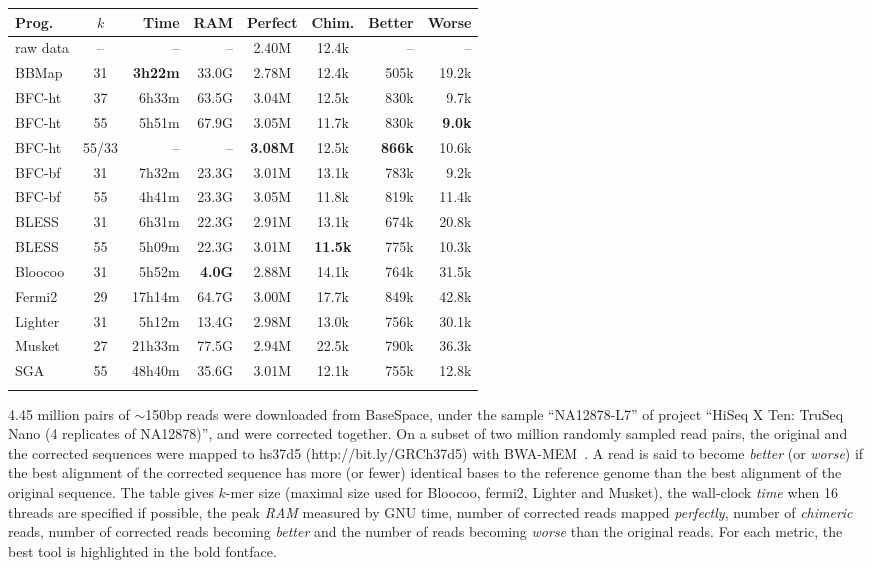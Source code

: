 \documentclass{bioinfo}
\begin{document}
\begin{table}[t]
{\footnotesize
\begin{tabular}{lcrrccrr}
\toprule
Prog.     & $k$ & Time  & RAM   & Perfect&Chim.& Better & Worse \\
\midrule
raw data  & --  & --    & --    & 2.40M  & 12.4k  & --     & -- \\
BBMap     & 31  &{\bf 3h22m}&33.0G& 2.78M& 12.4k  & 505k   & 19.2k \\
BFC-ht    & 37  & 6h33m & 63.5G & 3.04M  & 12.5k  & 830k   & 9.7k \\
BFC-ht    & 55  & 5h51m & 67.9G & 3.05M  &11.7k& 830k   &{\bf 9.0k}\\
BFC-ht    &55/33& --    & --    &{\bf 3.08M}&12.5k&{\bf 866k}&10.6k\\
BFC-bf    & 31  & 7h32m & 23.3G & 3.01M  & 13.1k  & 783k   & 9.2k \\
BFC-bf    & 55  & 4h41m & 23.3G & 3.05M  &11.8k& 819k   & 11.4k \\
BLESS     & 31  & 6h31m & 22.3G & 2.91M  & 13.1k  & 674k   & 20.8k \\
BLESS     & 55  & 5h09m & 22.3G & 3.01M  &{\bf 11.5k}& 775k& 10.3k \\
Bloocoo   & 31  & 5h52m &{\bf 4.0G}&2.88M& 14.1k  & 764k   & 31.5k  \\
Fermi2    & 29  &17h14m & 64.7G & 3.00M  & 17.7k  & 849k   &42.8k \\
Lighter   & 31  & 5h12m & 13.4G & 2.98M  & 13.0k  & 756k   & 30.1k  \\
Musket    & 27  &21h33m & 77.5G & 2.94M  & 22.5k  & 790k   & 36.3k  \\
SGA       & 55  &48h40m & 35.6G & 3.01M  & 12.1k  & 755k   & 12.8k  \\
\botrule
\end{tabular}}{4.45 million pairs of $\sim$150bp reads were downloaded from
BaseSpace, under the sample ``NA12878-L7'' of project ``HiSeq X Ten: TruSeq
Nano (4 replicates of NA12878)'', and were corrected together. On a subset of
two million randomly sampled read pairs, the original and the corrected
sequences were mapped to hs37d5 (http://bit.ly/GRCh37d5) with
BWA-MEM~\citep{Li:2013aa}.  A read is said to become \emph{better} (or
\emph{worse}) if the best alignment of the corrected sequence has more (or
fewer) identical bases to the reference genome than the best alignment of the
original sequence. The table gives $k$-mer size (maximal size used for Bloocoo,
fermi2, Lighter and Musket), the wall-clock \emph{time} when 16 threads are
specified if possible, the peak \emph{RAM} measured by GNU time, number of
corrected reads mapped \emph{perfectly}, number of \emph{chimeric} reads,
number of corrected reads becoming \emph{better} and the number of reads
becoming \emph{worse} than the original reads. For each metric, the best tool
is highlighted in the bold fontface.}
\end{table}
\end{document}
